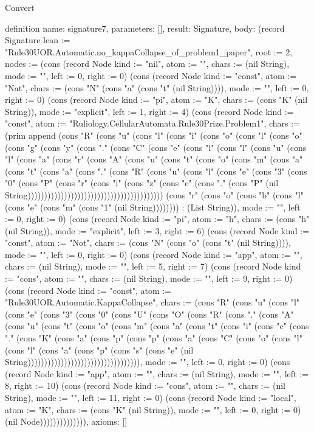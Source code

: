 \begin{lexlean}{Convert}
\begin{semanticmodule}
definition{
  name: signature7,
  parameters: [],
  result: Signature,
  body: (record Signature {lean := "Rule30UOR.Automatic.no_kappaCollapse_of_problem1_paper", root := 2, nodes := (cons (record Node {kind := "nil", atom := "", chars := (nil String), mode := "", left := 0, right := 0}) (cons (record Node {kind := "const", atom := "Nat", chars := (cons "N" (cons "a" (cons "t" (nil String)))), mode := "", left := 0, right := 0}) (cons (record Node {kind := "pi", atom := "K", chars := (cons "K" (nil String)), mode := "explicit", left := 1, right := 4}) (cons (record Node {kind := "const", atom := "Ruliology.CellularAutomata.Rule30Prize.Problem1", chars := (prim append (cons "R" (cons "u" (cons "l" (cons "i" (cons "o" (cons "l" (cons "o" (cons "g" (cons "y" (cons "." (cons "C" (cons "e" (cons "l" (cons "l" (cons "u" (cons "l" (cons "a" (cons "r" (cons "A" (cons "u" (cons "t" (cons "o" (cons "m" (cons "a" (cons "t" (cons "a" (cons "." (cons "R" (cons "u" (cons "l" (cons "e" (cons "3" (cons "0" (cons "P" (cons "r" (cons "i" (cons "z" (cons "e" (cons "." (cons "P" (nil String))))))))))))))))))))))))))))))))))))))))) (cons "r" (cons "o" (cons "b" (cons "l" (cons "e" (cons "m" (cons "1" (nil String)))))))) : (List String)), mode := "", left := 0, right := 0}) (cons (record Node {kind := "pi", atom := "h", chars := (cons "h" (nil String)), mode := "explicit", left := 3, right := 6}) (cons (record Node {kind := "const", atom := "Not", chars := (cons "N" (cons "o" (cons "t" (nil String)))), mode := "", left := 0, right := 0}) (cons (record Node {kind := "app", atom := "", chars := (nil String), mode := "", left := 5, right := 7}) (cons (record Node {kind := "cons", atom := "", chars := (nil String), mode := "", left := 9, right := 0}) (cons (record Node {kind := "const", atom := "Rule30UOR.Automatic.KappaCollapse", chars := (cons "R" (cons "u" (cons "l" (cons "e" (cons "3" (cons "0" (cons "U" (cons "O" (cons "R" (cons "." (cons "A" (cons "u" (cons "t" (cons "o" (cons "m" (cons "a" (cons "t" (cons "i" (cons "c" (cons "." (cons "K" (cons "a" (cons "p" (cons "p" (cons "a" (cons "C" (cons "o" (cons "l" (cons "l" (cons "a" (cons "p" (cons "s" (cons "e" (nil String)))))))))))))))))))))))))))))))))), mode := "", left := 0, right := 0}) (cons (record Node {kind := "app", atom := "", chars := (nil String), mode := "", left := 8, right := 10}) (cons (record Node {kind := "cons", atom := "", chars := (nil String), mode := "", left := 11, right := 0}) (cons (record Node {kind := "local", atom := "K", chars := (cons "K" (nil String)), mode := "", left := 0, right := 0}) (nil Node)))))))))))))}),
  axioms: []
}


\end{semanticmodule}
\end{lexlean}
